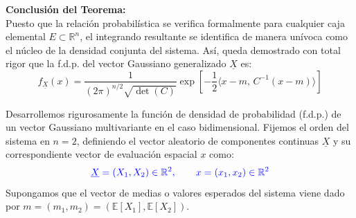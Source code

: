 \noindent \textbf{Conclusión del Teorema:} \\
Puesto que la relación probabilística se verifica formalmente para cualquier caja elemental $E \subset \mathbb{R}^n$, el integrando resultante se identifica de manera unívoca como el núcleo de la densidad conjunta del sistema. Así, queda demostrado con total rigor que la f.d.p. del vector Gaussiano generalizado $\underline{X}$ es:
\[
f_{\underline{X}}(x) = \frac{1}{(2\pi)^{n/2} \sqrt{\det(C)}} \exp\left[ -\frac{1}{2} \langle x-m, \, C^{-1}(x-m) \rangle \right]
\]

\begin{ejemplo}[Deducción Explícita para la Dimensión $n = 2$]
Desarrollemos rigurosamente la función de densidad de probabilidad (f.d.p.) de un vector Gaussiano multivariante en el caso bidimensional. Fijemos el orden del sistema en $n = 2$, definiendo el vector aleatorio de componentes continuas $\underline{X}$ y su correspondiente vector de evaluación espacial $x$ como:
\[
{\color{blue}\underline{X} = (X_1, X_2) \in \mathbb{R}^2, \qquad x = (x_1, x_2) \in \mathbb{R}^2}
\]
Supongamos que el vector de medias o valores esperados del sistema viene dado por $m = (m_1, m_2) = (\mathbb{E}[X_1], \mathbb{E}[X_2])$.

\vspace{0.4cm}


\end{ejemplo}
